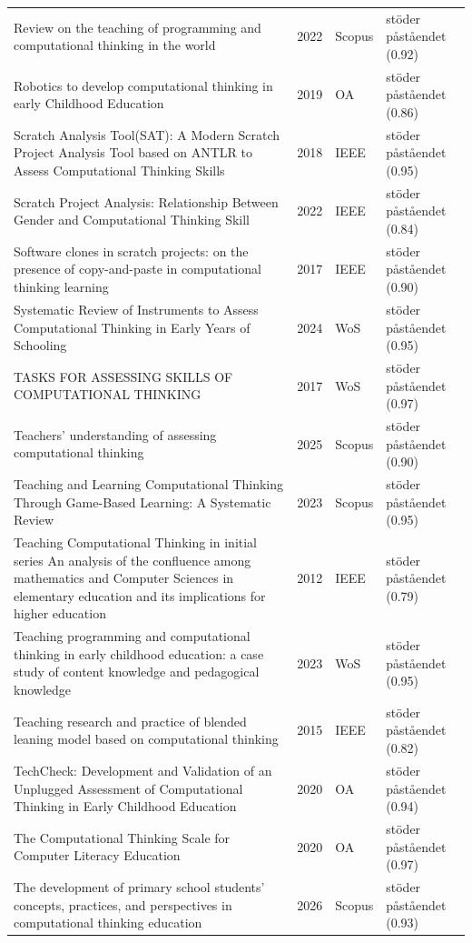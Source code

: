 \begin{longtable}{@{}%
  >{\raggedright\arraybackslash}p{}c%
  >{\raggedright\arraybackslash}p{}%
  >{\raggedright\arraybackslash}p{}@{}}
Review on the teaching of programming and computational thinking in the world & 2022 & Scopus & stöder påståendet (0.92) \\
Robotics to develop computational thinking in early Childhood Education & 2019 & OA & stöder påståendet (0.86) \\
Scratch Analysis Tool(SAT): A Modern Scratch Project Analysis Tool based on ANTLR to Assess Computational Thinking Skills & 2018 & IEEE & stöder påståendet (0.95) \\
Scratch Project Analysis: Relationship Between Gender and Computational Thinking Skill & 2022 & IEEE & stöder påståendet (0.84) \\
Software clones in scratch projects: on the presence of copy-and-paste in computational thinking learning & 2017 & IEEE & stöder påståendet (0.90) \\
Systematic Review of Instruments to Assess Computational Thinking in Early Years of Schooling & 2024 & WoS & stöder påståendet (0.95) \\
TASKS FOR ASSESSING SKILLS OF COMPUTATIONAL THINKING & 2017 & WoS & stöder påståendet (0.97) \\
Teachers' understanding of assessing computational thinking & 2025 & Scopus & stöder påståendet (0.90) \\
Teaching and Learning Computational Thinking Through Game-Based Learning: A Systematic Review & 2023 & Scopus & stöder påståendet (0.95) \\
Teaching Computational Thinking in initial series An analysis of the confluence among mathematics and Computer Sciences in elementary education and its implications for higher education & 2012 & IEEE & stöder påståendet (0.79) \\
Teaching programming and computational thinking in early childhood education: a case study of content knowledge and pedagogical knowledge & 2023 & WoS & stöder påståendet (0.95) \\
Teaching research and practice of blended leaning model based on computational thinking & 2015 & IEEE & stöder påståendet (0.82) \\
TechCheck: Development and Validation of an Unplugged Assessment of Computational Thinking in Early Childhood Education & 2020 & OA & stöder påståendet (0.94) \\
The Computational Thinking Scale for Computer Literacy Education & 2020 & OA & stöder påståendet (0.97) \\
The development of primary school students' concepts, practices, and perspectives in computational thinking education & 2026 & Scopus & stöder påståendet (0.93) \\

\end{longtable}
